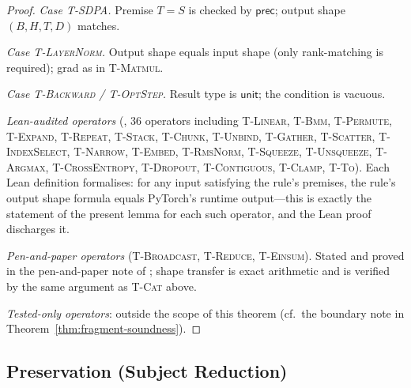 \begin{proof}
\emph{Case \textsc{T-SDPA}.}
Premise $T=S$ is checked by $\mathsf{prec}$; output shape $(B,H,T,D)$ matches.

\emph{Case \textsc{T-LayerNorm}.}
Output shape equals input shape (only rank-matching is required);
grad as in \textsc{T-Matmul}.

\emph{Case \textsc{T-Backward} / \textsc{T-OptStep}.}
Result type is $\mathsf{unit}$; the condition is vacuous.

\emph{Lean-audited operators}
(, 36 operators including \textsc{T-Linear},
\textsc{T-Bmm}, \textsc{T-Permute}, \textsc{T-Expand}, \textsc{T-Repeat},
\textsc{T-Stack}, \textsc{T-Chunk}, \textsc{T-Unbind},
\textsc{T-Gather}, \textsc{T-Scatter}, \textsc{T-IndexSelect},
\textsc{T-Narrow}, \textsc{T-Embed}, \textsc{T-RmsNorm},
\textsc{T-Squeeze}, \textsc{T-Unsqueeze},
\textsc{T-Argmax}, \textsc{T-CrossEntropy}, \textsc{T-Dropout},
\textsc{T-Contiguous}, \textsc{T-Clamp}, \textsc{T-To}).
Each Lean definition formalises: for any input satisfying the rule's premises,
the rule's output shape formula equals PyTorch's runtime output---this is exactly
the statement of the present lemma for each such operator, and the Lean proof
discharges it.

\emph{Pen-and-paper operators} (\textsc{T-Broadcast}, \textsc{T-Reduce},
\textsc{T-Einsum}).
Stated and proved in the pen-and-paper note of
; shape transfer is exact arithmetic and
is verified by the same argument as \textsc{T-Cat} above.

\emph{Tested-only operators}: outside the scope of this theorem
(cf.\ the boundary note in Theorem~\ref{thm:fragment-soundness}).
\end{proof}

\subsection{Preservation (Subject Reduction)}

